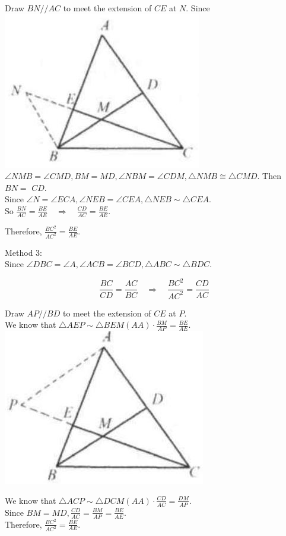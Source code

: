 \documentclass{article}
\begin{document}
Draw \(B N / / A C\) to meet the extension of \(C E\) at \(N\). Since\\
\includegraphics[width=\textwidth]{images/115(2).jpg} \(\angle N M B=\angle C M D, B M=M D, \angle N B M=\angle C D M, \triangle N M B \cong \triangle C M D\). Then \(B N=\) \(C D\).\\
Since \(\angle N=\angle E C A, \angle N E B=\angle C E A, \triangle N E B \sim \triangle C E A\).\\
So \(\frac{B N}{A C}=\frac{B E}{A E} \quad \Rightarrow \quad \frac{C D}{A C}=\frac{B E}{A E}\).


Therefore, \(\frac{B C^{2}}{A C^{2}}=\frac{B E}{A E}\).

Method 3:\\
Since \(\angle D B C=\angle A, \angle A C B=\angle B C D, \triangle A B C \sim \triangle B D C\).

\[
\frac{B C}{C D}=\frac{A C}{B C} \quad \Rightarrow \quad \frac{B C^{2}}{A C^{2}}=\frac{C D}{A C}
\]

Draw \(A P / / B D\) to meet the extension of \(C E\) at \(P\).\\
We know that \(\triangle A E P \sim \triangle B E M(A A) \cdot \frac{B M}{A P}=\frac{B E}{A E}\).\\
\centering
\includegraphics[width=\textwidth]{images/116.jpg}

We know that \(\triangle A C P \sim \triangle D C M(A A) \cdot \frac{C D}{A C}=\frac{D M}{A P}\).\\
Since \(B M=M D, \frac{C D}{A C}=\frac{B M}{A P}=\frac{B E}{A E}\).\\
Therefore, \(\frac{B C^{2}}{A C^{2}}=\frac{B E}{A E}\).
\end{document}
